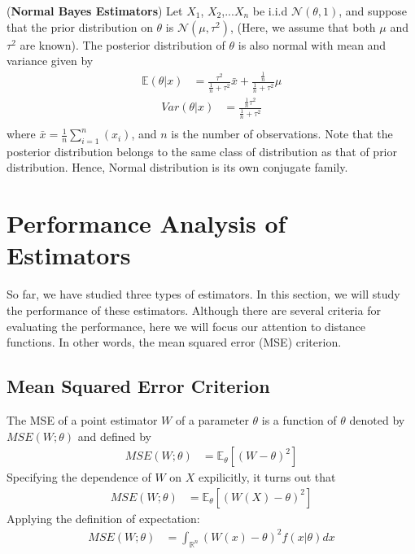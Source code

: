 \documentclass[12pt]{report}
\begin{document}
\begin{exmp}(\textbf{Normal Bayes Estimators})
Let $X_1$, $X_2$,...$X_n$ be i.i.d $\mathcal{N}(\theta , 1)$, and suppose that the prior distribution on $\theta$ is $\mathcal{N}(\mu , \tau ^2)$, (Here, we assume that both $\mu$ and $\tau ^2$ are known). The posterior distribution of $\theta$ is also normal with mean and variance given by 
\begin{align*}
\mathbb{E}(\theta | x) &= \frac{\tau ^2}{\frac{1}{n} + \tau ^2} \bar{x} + \frac{\frac{1}{n}}{\frac{1}{n} + \tau ^2} \mu \end{align*}
\begin{align*}
Var(\theta | x) &= \frac{\frac{1}{n} \tau ^2}{\frac{1}{n} + \tau ^2}\\
\end{align*}
where $\bar{x} = \frac{1}{n} \sum_{i=1}^{n}(x_i)$, and $n$ is the number of observations. Note that the posterior distribution belongs to the same class of distribution as that of prior distribution. Hence, Normal distribution is its own conjugate family.
\end{exmp}
\section{Performance Analysis of Estimators}
So far, we have studied three types of estimators. In this section, we will study the performance of these estimators. Although there are several criteria for evaluating the performance, here we will focus our attention to distance functions. In other words, the mean squared error (MSE) criterion.
\subsection{Mean Squared Error Criterion}
\begin{defn}
The MSE of a point estimator $W$ of a parameter $\theta$ is a function of $\theta$ denoted by $MSE(W ; \theta)$ and defined by
\begin{align*}
MSE(W ; \theta) &= \mathbb{E}_\theta[(W - \theta)^2]
\end{align*}
Specifying the dependence of $W$ on $X$ expilicitly, it turns out that
\begin{align*}
MSE(W ; \theta) &= \mathbb{E}_\theta[(W(X) - \theta)^2]
\end{align*}
Applying the definition of expectation:
\begin{align*}
MSE(W ; \theta) &= \int_{\mathbb{R}^n} (W(x) - \theta)^2 f(x | \theta) dx
\end{align*} 
\end{defn}
\end{document}
